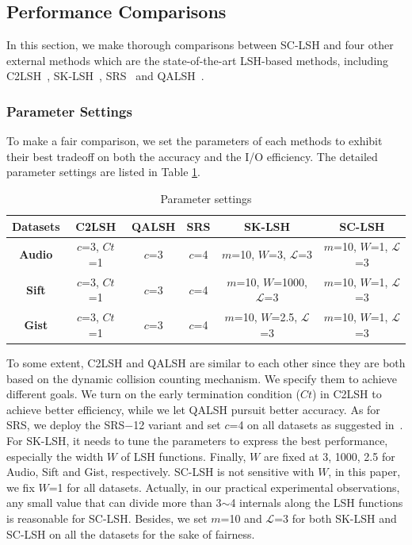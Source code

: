 \documentclass[twocolumn]{svjour3}          %
\begin{document}
\subsection{Performance Comparisons}
In this section, we make thorough comparisons between SC-LSH and four other external methods which are the state-of-the-art LSH-based methods, including C2LSH~\cite{Gan2012C2LSH}, SK-LSH~\cite{Liu2014SKLSH}, SRS~\cite{Sun2014SRS} and QALSH~\cite{Huang2015QALSH}.

\subsubsection{Parameter Settings}\label{sssec:ps}
To make a fair comparison, we set the parameters of each methods to exhibit their best tradeoff on both the accuracy and the I/O efficiency. The detailed parameter settings are listed in Table \ref{tbl:para}.
\begin{table}[t]
	\centering
	\caption{Parameter settings}\label{tbl:para}
	\begin{tabular}{|c|c|c|c|c|c|}
		\hline
		Datasets & C2LSH & QALSH & SRS & SK-LSH & SC-LSH\\
		\hline
		\textbf{Audio} & $c$=3, $Ct$=1 & $c$=3 & $c$=4 & $m$=10, $W$=3, $\mathcal{L}$=3 & $m$=10, $W$=1, $\mathcal{L}$=3 \\
		\textbf{Sift} & $c$=3, $Ct$=1 & $c$=3 & $c$=4 & $m$=10, $W$=1000, $\mathcal{L}$=3 & $m$=10, $W$=1, $\mathcal{L}$=3 \\
		\textbf{Gist} & $c$=3, $Ct$=1 & $c$=3 & $c$=4 & $m$=10, $W$=2.5, $\mathcal{L}$=3 & $m$=10, $W$=1, $\mathcal{L}$=3\\
		\hline
	\end{tabular}
\end{table}%

To some extent, C2LSH and QALSH are similar to each other since they are both based on the dynamic collision counting mechanism. We specify them to achieve different goals. We turn on the early termination condition ($Ct$) in C2LSH to achieve better efficiency, while we let QALSH pursuit better accuracy. As for SRS, we deploy the SRS$-$12 variant and set $c$=4 on all datasets as suggested in~\cite{Sun2014SRS}. For SK-LSH, it needs to tune the parameters to express the best performance, especially the width $W$ of LSH functions. Finally, $W$ are fixed at 3, 1000, 2.5 for Audio, Sift and Gist, respectively. SC-LSH is not sensitive with $W$, in this paper, we fix $W$=1 for all datasets. Actually, in our practical experimental observations, any small value that can divide more than 3$\sim$4 internals along the LSH functions is reasonable for SC-LSH. Besides, we set $m$=10 and $\mathcal{L}$=3 for both SK-LSH and SC-LSH on all the datasets for the sake of fairness.
\end{document}

